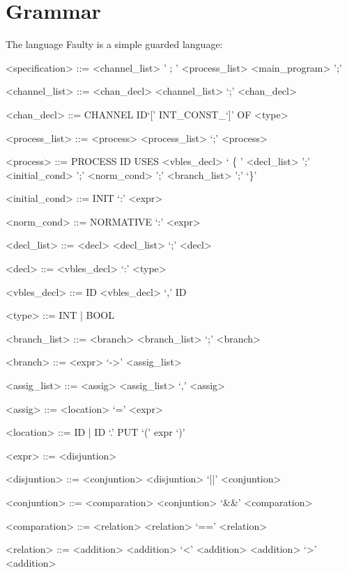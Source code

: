 \section{Grammar}

The language Faulty is a simple guarded language:

\setlength{\grammarparsep}{20pt plus 1pt minus 1pt} %
\setlength{\grammarindent}{12em} %

\begin{grammar}


<specification> ::= <channel_list> ' ; ' <process_list>  <main_program> ';'

<channel_list> ::= <chan_decl> 
\alt <channel_list>  `;' <chan_decl>

<chan_decl> ::=  CHANNEL ID`[' INT_CONST_`]' OF <type>


<process_list> ::=  <process> 
\alt  <process_list> `;' <process>


<process>  ::= PROCESS ID USES  <vbles_decl> ` \{ ' <decl_list> ';' <initial_cond> ';' <norm_cond> ';'   <branch_list> ';' `\}'

<initial_cond> ::= INIT `:' <expr>

<norm_cond> ::= NORMATIVE `:' <expr>

<decl_list> ::= <decl> 
\alt <decl_list>  `;' <decl>

<decl> ::=  <vbles_decl> `:' <type> 
                
<vbles_decl> ::=  ID 
\alt <vbles_decl>  `,' ID

<type> ::= INT | BOOL

<branch_list> ::=  <branch> 
\alt  <branch_list> `;' <branch>

<branch>  ::=  <expr> `->' <assig_list>

<assig_list> ::=  <assig>
\alt <assig_list>  `,' <assig>

<assig> ::= <location> `=' <expr>
            
<location> ::=   ID            
                        | ID `.' PUT `(' expr `)'


<expr> ::= <disjuntion>

<disjuntion> ::= <conjuntion>
\alt <disjuntion>  `||' <conjuntion>

<conjuntion> ::= <comparation>
\alt <conjuntion>  `&&' <comparation>

<comparation> ::= <relation>
\alt <relation>  `==' <relation>

<relation> ::= <addition>
\alt <addition>  `<' <addition>
\alt <addition>  `>' <addition>


\end{grammar}
